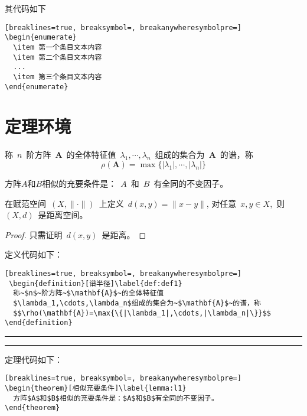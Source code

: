 其代码如下

\begin{Verbatim}[breaklines=true, breaksymbol=, breakanywheresymbolpre=]
\begin{enumerate}
  \item 第一个条目文本内容
  \item 第二个条目文本内容
  ...
  \item 第三个条目文本内容
\end{enumerate}
\end{Verbatim}



\section{定理环境}

\begin{definition}[谱半径]\label{def:def1}
  称~$n$~阶方阵~$\mathbf{A}$~的全体特征值~$\lambda_1,\cdots,\lambda_n$~组成的集合为~$\mathbf{A}$~的谱，称
  $$\rho(\mathbf{A})=\max{\{|\lambda_1|,\cdots,|\lambda_n|\}}$$
\end{definition}
\begin{theorem}[相似充要条件]\label{lemma:l1}
  方阵$A$和$B$相似的充要条件是：~$A$~和~$B$~有全同的不变因子。
\end{theorem}
\begin{corollary}[推论1]\label{cor:cor1}
在赋范空间~$(X,\|\cdot\|)$~上定义~$d(x,y)=\|x-y\|$, 对任意~$x,y\in X$,~则~$(X,d)$~是距离空间。
\end{corollary}
\begin{proof}
  只需证明~$d(x,y)$~是距离。
\end{proof}
\newpage

定义代码如下：
\begin{Verbatim}[breaklines=true, breaksymbol=, breakanywheresymbolpre=]
 \begin{definition}[谱半径]\label{def:def1}
  称~$n$~阶方阵~$\mathbf{A}$~的全体特征值
  $\lambda_1,\cdots,\lambda_n$组成的集合为~$\mathbf{A}$~的谱，称
  $$\rho(\mathbf{A})=\max{\{|\lambda_1|,\cdots,|\lambda_n|\}}$$
\end{definition}
\end{Verbatim}
\noindent\hrule

\vspace{0.1em}\noindent\hrule
\vspace{1em}
定理代码如下：
\begin{Verbatim}[breaklines=true, breaksymbol=, breakanywheresymbolpre=]
\begin{theorem}[相似充要条件]\label{lemma:l1}
  方阵$A$和$B$相似的充要条件是：$A$和$B$有全同的不变因子。
\end{theorem}
\end{Verbatim}

